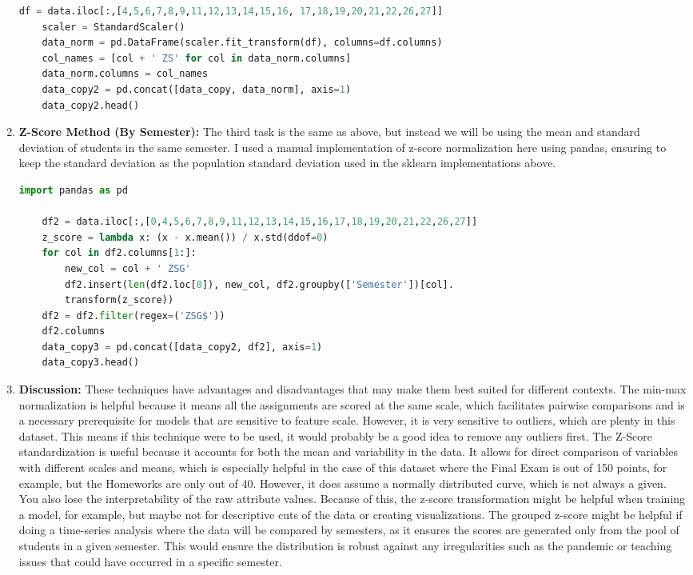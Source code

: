 \documentclass{article}
\begin{document}
\begin{enumerate}
\begin{lstlisting}[language=Python]
    df = data.iloc[:,[4,5,6,7,8,9,11,12,13,14,15,16, 17,18,19,20,21,22,26,27]]
    scaler = StandardScaler()
    data_norm = pd.DataFrame(scaler.fit_transform(df), columns=df.columns)
    col_names = [col + ' ZS' for col in data_norm.columns]
    data_norm.columns = col_names
    data_copy2 = pd.concat([data_copy, data_norm], axis=1)
    data_copy2.head()
    \end{lstlisting}
    \item \textbf{Z-Score Method (By Semester):} The third task is the same as above, but instead we will be using the mean and standard deviation of students in the same semester. I used a manual implementation of z-score normalization here using pandas, ensuring to keep the standard deviation as the population standard deviation used in the sklearn implementations above.
    \begin{lstlisting}[language=Python]
    import pandas as pd
    
    df2 = data.iloc[:,[0,4,5,6,7,8,9,11,12,13,14,15,16,17,18,19,20,21,22,26,27]]
    z_score = lambda x: (x - x.mean()) / x.std(ddof=0)
    for col in df2.columns[1:]: 
        new_col = col + ' ZSG'
        df2.insert(len(df2.loc[0]), new_col, df2.groupby(['Semester'])[col].
        transform(z_score))
    df2 = df2.filter(regex=('ZSG$'))
    df2.columns
    data_copy3 = pd.concat([data_copy2, df2], axis=1)
    data_copy3.head()
    \end{lstlisting}
    \item \textbf{Discussion:} These techniques have advantages and disadvantages that may make them best suited for different contexts. The min-max normalization is helpful because it means all the assignments are scored at the same scale, which facilitates pairwise comparisons and is a necessary prerequisite for models that are sensitive to feature scale. However, it is very sensitive to outliers, which are plenty in this dataset. This means if this technique were to be used, it would probably be a good idea to remove any outliers first. The Z-Score standardization is useful because it accounts for both the mean and variability in the data. It allows for direct comparison of variables with different scales and means, which is especially helpful in the case of this dataset where the Final Exam is out of 150 points, for example, but the Homeworks are only out of 40. However, it does assume a normally distributed curve, which is not always a given. You also lose the interpretability of the raw attribute values. Because of this, the z-score transformation might be helpful when training a model, for example, but maybe not for descriptive cuts of the data or creating visualizations. The grouped z-score might be helpful if doing a time-series analysis where the data will be compared by semesters, as it ensures the scores are generated only from the pool of students in a given semester. This would ensure the distribution is robust against any irregularities such as the pandemic or teaching issues that could have occurred in a specific semester. 
    
\end{enumerate}
 
\end{document}

